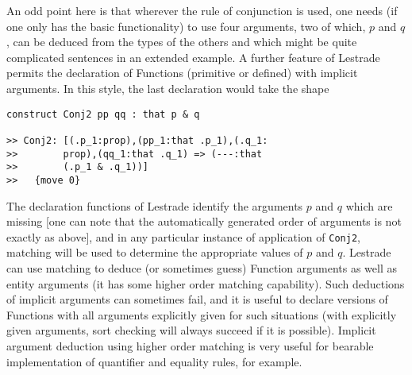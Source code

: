 \documentclass{article}
\begin{document}
An odd point here is that wherever the rule of conjunction is used, one needs (if one only has the basic functionality) to use four arguments, two of which,
$p$ and $q$, can be deduced from the types of the others and which might be quite complicated sentences in an extended example.  A further feature of Lestrade permits the declaration of Functions (primitive or defined) with implicit arguments.  In this style, the last declaration would take the shape

\begin{verbatim}
construct Conj2 pp qq : that p & q

>> Conj2: [(.p_1:prop),(pp_1:that .p_1),(.q_1:
>>        prop),(qq_1:that .q_1) => (---:that 
>>        (.p_1 & .q_1))]
>>   {move 0}

\end{verbatim}

The declaration functions of Lestrade identify the arguments $p$ and $q$ which are missing [one can note that the automatically generated order of arguments is not exactly as above], and in any particular instance of application of {\tt Conj2}, matching will be used to determine the appropriate values of $p$ and $q$.  Lestrade can use matching to deduce (or sometimes guess) Function arguments as well as entity arguments (it has some higher order matching capability).  Such deductions of implicit arguments can sometimes fail, and it is useful to declare versions of
Functions with all arguments explicitly given for such situations (with explicitly given arguments, sort checking will always succeed if it is possible).  Implicit argument deduction using higher order matching is very useful for bearable implementation of quantifier and equality rules, for example.
\end{document}
